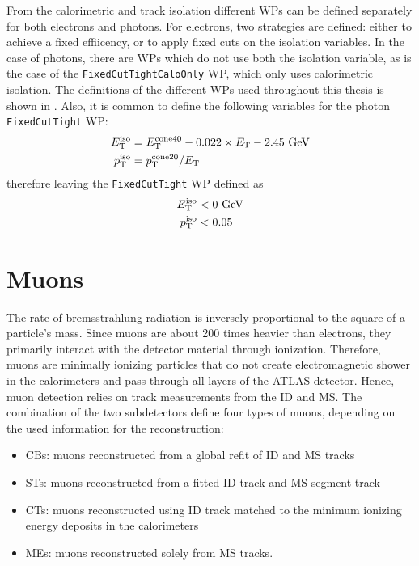 From the calorimetric and track isolation different \acp{WP} can be defined separately for both electrons and photons. For electrons, two strategies are defined: either to achieve a fixed effiicency, or to apply fixed cuts on the isolation variables. In the case of photons, there are \acp{WP} which do not use both the isolation variable, as is the case of the \texttt{FixedCutTightCaloOnly} \ac{WP}, which only uses calorimetric isolation. The definitions of the different \acp{WP} used throughout this thesis is shown in \Tab{\ref{fig:objects:egamma:iso:iso_table}}. Also, it is common to define the following variables for the photon \texttt{FixedCutTight} \ac{WP}:
\begin{align}
    \label{eq:objects:egamma:iso:definitions}
    E_{\text{T}}^{\text{iso}} &= E_{\text{T}}^{\text{cone40}} - 0.022 \times E_{\text{T}} - 2.45~\text{GeV}\\
    p_{\text{T}}^{\text{iso}} &= p_{\text{T}}^{\text{cone20}} / E_{\text{T}}
\end{align}
therefore leaving the \texttt{FixedCutTight} \ac{WP} defined as
\begin{align}
    E_{\text{T}}^{\text{iso}} &< 0 ~\text{GeV}\\
    p_{\text{T}}^{\text{iso}} &< 0.05 
\end{align}















\section{Muons}



The rate of bremsstrahlung radiation is inversely proportional to the square of a particle's mass. Since muons are about 200 times heavier than electrons, they primarily interact with the detector material through ionization. Therefore, muons are minimally ionizing particles that do not create electromagnetic shower in the calorimeters and pass through all layers of the \ac{ATLAS} detector. Hence, muon detection relies on track measurements from the \ac{ID} and \ac{MS}. The combination of the two subdetectors define four types of muons, depending on the used information for the reconstruction:
\begin{itemize}
    \item \acp{CB}: muons reconstructed from a global refit of \ac{ID} and \ac{MS} tracks
    \item \acp{ST}: muons reconstructed from a fitted \ac{ID} track and \ac{MS} segment track
    \item \acp{CT}: muons reconstructed using \ac{ID} track matched to the minimum ionizing energy deposits in the calorimeters
    \item \acp{ME}: muons reconstructed solely from \ac{MS} tracks.
\end{itemize}


